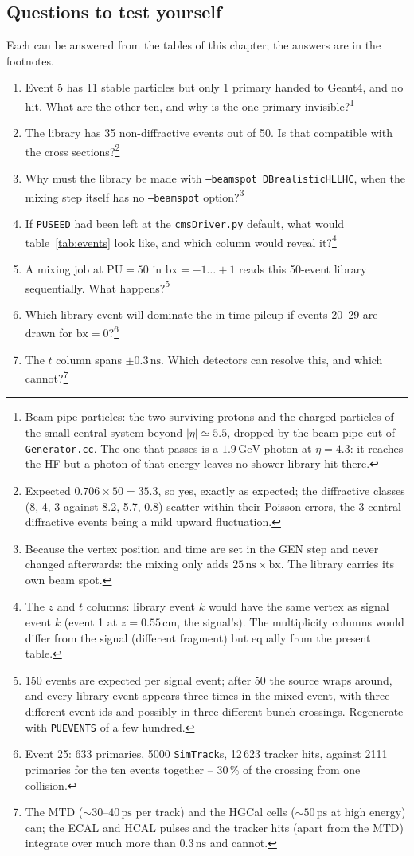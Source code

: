 \documentclass[11pt,a4paper]{article}
\newcommand{\code}[1]{\texttt{#1}}
\newcommand{\bx}{\ensuremath{\mathrm{bx}}}
\newcommand{\GeV}{\,\mathrm{GeV}}
\newcommand{\ns}{\,\mathrm{ns}}
\newcommand{\ps}{\,\mathrm{ps}}
\newcommand{\cm}{\,\mathrm{cm}}
\begin{document}
\subsection{Questions to test yourself}

Each can be answered from the tables of this chapter; the answers are in the footnotes.
\begin{enumerate}
\item Event 5 has 11 stable particles but only 1 primary handed to Geant4, and no hit. What are the other
  ten, and why is the one primary invisible?\footnote{Beam-pipe particles: the two surviving protons and
  the charged particles of the small central system beyond $|\eta|\simeq5.5$, dropped by the beam-pipe cut
  of \code{Generator.cc}. The one that passes is a $1.9\GeV$ photon at $\eta=4.3$: it reaches the HF but a
  photon of that energy leaves no shower-library hit there.}
\item The library has 35 non-diffractive events out of 50. Is that compatible with the cross sections?\footnote{Expected
  $0.706\times50 = 35.3$, so yes, exactly as expected; the diffractive classes (8, 4, 3 against 8.2, 5.7,
  0.8) scatter within their Poisson errors, the 3 central-diffractive events being a mild upward fluctuation.}
\item Why must the library be made with \code{--beamspot DBrealisticHLLHC}, when the mixing step itself has
  no \code{--beamspot} option?\footnote{Because the vertex position and time are set in the GEN step and
  never changed afterwards: the mixing only adds $25\ns\times\bx$. The library carries its own beam spot.}
\item If \code{PUSEED} had been left at the \code{cmsDriver.py} default, what would table~\ref{tab:events}
  look like, and which column would reveal it?\footnote{The $z$ and $t$ columns: library event $k$ would
  have the same vertex as signal event $k$ (event 1 at $z=0.55\cm$, the signal's). The multiplicity columns
  would differ from the signal (different fragment) but equally from the present table.}
\item A mixing job at $\mathrm{PU}=50$ in $\bx=-1\ldots+1$ reads this 50-event library sequentially. What
  happens?\footnote{150 events are expected per signal event; after 50 the source wraps around, and every
  library event appears three times in the mixed event, with three different event ids and possibly in
  three different bunch crossings. Regenerate with \code{PUEVENTS} of a few hundred.}
\item Which library event will dominate the in-time pileup if events 20--29 are drawn for $\bx=0$?\footnote{Event
  25: 633 primaries, 5000 \code{SimTrack}s, 12\,623 tracker hits, against 2111 primaries for the ten events
  together -- 30\,\% of the crossing from one collision.}
\item The $t$ column spans $\pm0.3\ns$. Which detectors can resolve this, and which cannot?\footnote{The MTD
  ($\sim30$--$40\ps$ per track) and the HGCal cells ($\sim50\ps$ at high energy) can; the ECAL and HCAL pulses
  and the tracker hits (apart from the MTD) integrate over much more than $0.3\ns$ and cannot.}
\end{enumerate}
\end{document}
